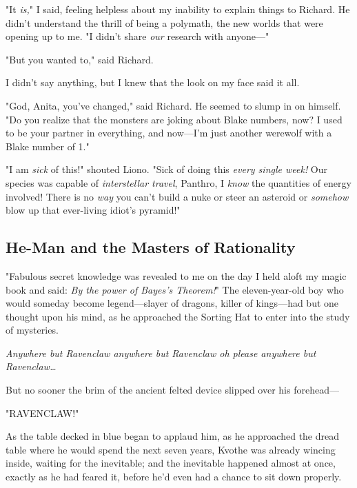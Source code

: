 "It \emph{is,}" I said, feeling helpless about my inability to explain things 
to Richard. He didn't understand the thrill of being a polymath, the new worlds 
that were opening up to me. "I didn't share \emph{our} research with anyone---"

"But you wanted to," said Richard.

I didn't say anything, but I knew that the look on my face said it all.

"God, Anita, you've changed," said Richard. He seemed to slump in on himself. 
"Do you realize that the monsters are joking about Blake numbers, now? I used 
to be your partner in everything, and now---I'm just another werewolf with a 
Blake number of 1."
\sbreak


\noindent{}"I am \emph{sick} of this!" shouted Liono. "Sick of doing this \emph{every 
single week!} Our species was capable of \emph{interstellar travel}, Panthro, I 
\emph{know} the quantities of energy involved! There is no \emph{way} you can't 
build a nuke or steer an asteroid or \emph{somehow} blow up that ever-living 
idiot's pyramid!"
\sbreak

\subsection{He-Man and the Masters of Rationality}

"Fabulous secret knowledge was revealed to me on the day I held aloft my magic 
book and said: \emph{By the power of Bayes's Theorem!}"
\sbreak
The eleven-year-old boy who would someday become legend---slayer of dragons, 
killer of kings---had but one thought upon his mind, as he approached the 
Sorting Hat to enter into the study of mysteries.

\emph{Anywhere but Ravenclaw anywhere but Ravenclaw oh please anywhere but 
Ravenclaw{\ldots}}

But no sooner the brim of the ancient felted device slipped over his forehead---

"RAVENCLAW!"

As the table decked in blue began to applaud him, as he approached the dread 
table where he would spend the next seven years, Kvothe was already wincing 
inside, waiting for the inevitable; and the inevitable happened almost at once, 
exactly as he had feared it, before he'd even had a chance to sit down properly.

